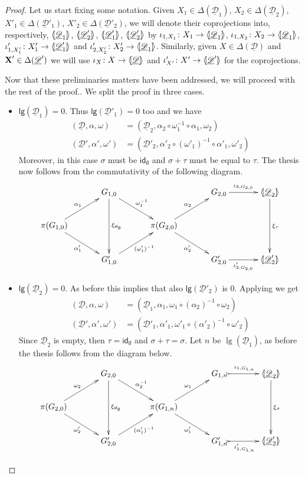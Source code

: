 \documentclass[a4paper]{article}
\newcommand{\id}[1]{\mathsf{id}_{#1}}
\def\X{\textbf {\textup{X}}}
\newcommand{\dder}[1]{\mathscr{#1}}
\newcommand{\der}[1]{\underline{\dder{#1}}}
\newcommand{\lpro}{\langle \hspace{-1.85pt}[}
\newcommand{\rpro}{]\hspace{-1.85pt}\rangle}
\newcommand{\tpro}[1]{\lpro \der{#1}\rpro}
\newcommand{\lgh}[0]{\mathsf{lg}}
\theoremstyle{definition}
\begin{document}
\begin{proof}
	Let us start fixing some notation. Given $X_1\in \Delta(\der{D}_1)$, $X_2\in \Delta(\der{D}_2)$, $X'_1\in \Delta(\der{D}'_1)$, $X'_2\in \Delta(\der{D}'_2)$, we will denote their coprojections into, respectively, $\lpro \der{D}_1\rpro$, $\lpro \der{D}'_2\rpro$, $\lpro \der{D}'_1\rpro$, $\lpro \der{D}'_2\rpro$ by
	$\iota_{1, X_1}\colon X_1\to \lpro\der{D}_1\rpro$, $\iota_{1, X_2}\colon X_2\to \lpro\der{D}_1\rpro$, $\iota'_{1, X'_1}\colon X'_1\to \lpro\der{D}'_1\rpro$ and $\iota'_{2, X'_2}\colon X'_2\to \lpro\der{D}_1\rpro$. Similarly, given $X\in \Delta(\der{D})$ and $\X'\in \Delta(\der{D}')$ we will use $\iota_X\colon X\to \tpro{D}$ and $\iota'_{X'}\colon X'\to \lpro \der{D}' \rpro$ for the coprojections.
	
	Now that these preliminaries matters have been addressed, we will proceed with the rest of the proof.. We split the proof in three cases.
	\begin{itemize}
	\item $\lgh(\der{D}_1)=0$. Thus $\lgh(\der{D}'_1)=0$ too  and we have
	\begin{align*}
		(\der{D}, \alpha, \omega)&=(\der{D}_2, \alpha_2\circ \omega_1^{-1}\circ \alpha_1, \omega_2) \\ (\der{D}', \alpha', \omega')&=(\der{D}'_2, \alpha'_2\circ (\omega'_1)^{-1}\circ \alpha'_1, \omega'_2)
	\end{align*}
	Moreover, in this case $\sigma$ must be $\id{\emptyset}$ and $\sigma+\tau$ must be equal to $\tau$. The thesis now follows from the commutativity of the following diagram.
	\[\xymatrix@C=35pt{& G_{1,0}\ar[dd]^{\xi_{\id{\emptyset}}} \ar[dr]^{\omega^{-1}_1}&&G_{2,0}\ar[r]^-{\iota_{2, G_{2,0}}} & \lpro \der{D}_2\rpro \ar[dd]^{\xi_{\tau}}\\\pi(G_{1,0})  \ar[ur]^{\alpha_1} \ar[dr]_{\alpha'_1}&& \pi(G_{2,0}) \ar[ur]^{\alpha_2} \ar[dr]_{\alpha'_2}\\& G'_{1,0} \ar[ur]_{(\omega'_1)^{-1}}&&G'_{2,0} \ar[r]_-{\iota'_{2, G_{2,0}}}& \lpro \der{D}'_2\rpro}\]
	
\item $\lgh(\der{D}_2)=0$.  As before this implies that also $\lgh(\der{D}'_2)$ is $0$.  Applying  we get 
	\begin{align*}
		(\der{D}, \alpha, \omega)&=(\der{D}_1, \alpha_1, \omega_1 \circ (\alpha_2)^{-1}\circ \omega_2) \\ (\der{D}', \alpha', \omega')&=(\der{D}'_1, \alpha'_1, \omega'_1 \circ (\alpha'_2)^{-1}\circ \omega'_2)
	\end{align*}
	Since $\der{D}_2$ is empty, then $\tau=\id{\emptyset}$ and $\sigma+\tau=\sigma$. Let $n$ be $\lg(\der{D}_1)$, as before the thesis follows from the diagram below.
	\[\xymatrix@C=35pt{& G_{2,0}\ar[dd]^{\xi_{\id{\emptyset}}} \ar[dr]^{\alpha^{-1}_2}&&G_{1,n}\ar@{>->}[r]^-{\iota_{1, G_{1,n}}} & \lpro \der{D}_2\rpro \ar[dd]^{\xi_{\sigma}}\\\pi(G_{2,0})  \ar[ur]^{\omega_2} \ar[dr]_{\omega'_2}&& \pi(G_{1,n}) \ar[ur]^{\omega_1} \ar[dr]_{\omega'_1}\\& G'_{2,0} \ar[ur]_{(\alpha'_1)^{-1}}&&G'_{1,n} \ar@{>->}[r]_-{\iota'_{1, G_{1,n}}}& \lpro \der{D}'_2\rpro}\]
	

\end{itemize}
\end{proof}
\end{document}
